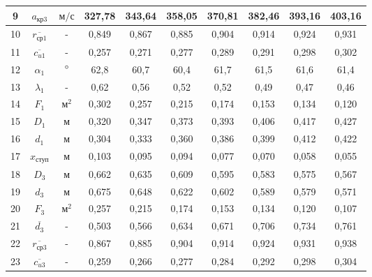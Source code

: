 \begin{landscape}
\begin{center}
\begin{longtable}{|c|c|c|c|c|c|c|c|c|c|}
				9 & $a_{кр3}$ & $м/с$ & 327,78 & 343,64 & 358,05 & 370,81 & 382,46 & 393,16 & 403,16 \\\hline
			
				10 & $\overline{r_{ср1}}$ & - & 0,849 & 0,867 & 0,885 & 0,904 & 0,914 & 0,924 & 0,931 \\\hline
			
				11 & $\overline{c_{u1}}$ & - & 0,257 & 0,271 & 0,277 & 0,289 & 0,291 & 0,298 & 0,302 \\\hline
			
				12 & $\alpha_1$ & $\degree$ & 62,8 & 60,7 & 60,4 & 61,7 & 61,5 & 61,6 & 61,4 \\\hline
			
				13 & $\lambda_1$ & - & 0,62 & 0,56 & 0,52 & 0,52 & 0,49 & 0,47 & 0,46 \\\hline
			
				14 & $F_1$ & $м^2$ & 0,302 & 0,257 & 0,215 & 0,174 & 0,153 & 0,134 & 0,120 \\\hline
			
				15 & $D_1$ & м & 0,320 & 0,347 & 0,373 & 0,393 & 0,406 & 0,417 & 0,427 \\\hline
			
				16 & $d_1$ & м & 0,304 & 0,333 & 0,360 & 0,386 & 0,399 & 0,412 & 0,422 \\\hline
			
				17 & $x_{ступ}$ & м & 0,103 & 0,095 & 0,094 & 0,077 & 0,070 & 0,058 & 0,055 \\\hline
			
				18 & $D_3$ & м & 0,662 & 0,635 & 0,609 & 0,595 & 0,583 & 0,575 & 0,567 \\\hline
			
				19 & $d_3$ & м & 0,675 & 0,648 & 0,622 & 0,602 & 0,589 & 0,579 & 0,571 \\\hline
			
				20 & $F_3$ & $м^2$ & 0,257 & 0,215 & 0,174 & 0,153 & 0,134 & 0,120 & 0,107 \\\hline
			
				21 & $\overline{d_3}$ & - & 0,503 & 0,566 & 0,634 & 0,671 & 0,706 & 0,734 & 0,761 \\\hline
			
				22 & $\overline{r_{ср3}}$ & - & 0,867 & 0,885 & 0,904 & 0,914 & 0,924 & 0,931 & 0,938 \\\hline
			
				23 & $\overline{c_{u3}}$ & - & 0,259 & 0,266 & 0,277 & 0,284 & 0,292 & 0,298 & 0,304 \\\hline
			

\end{longtable}
\end{center}
\end{landscape}
